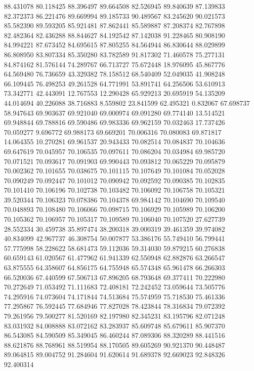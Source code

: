 88.431078
80.118425
88.396497
89.664508
82.526945
89.840639
87.139833
82.372373
86.221476
89.669994
89.185733
90.489567
83.245620
90.021573
85.582390
89.593205
85.921481
87.862441
85.589887
87.208374
82.767898
82.482364
82.436288
88.844627
84.192542
87.142038
91.228465
80.908190
84.994221
87.673452
84.695615
87.805255
84.564944
86.830644
88.029899
86.808950
83.807334
85.350280
83.782589
91.817302
71.460578
75.277131
84.874162
81.576144
74.289767
66.713727
75.672448
18.976095
45.867776
64.569480
76.736659
43.329382
78.158512
68.540409
52.049035
41.908248
66.109445
76.498253
49.261528
64.771991
53.891741
64.256506
53.610913
73.342771
42.443091
12.767553
12.290428
65.929213
20.695919
54.135209
44.014694
40.226088
38.716883
8.559802
23.841599
62.495321
0.832067
67.698737
58.947643
69.903637
69.921040
69.000974
69.091280
69.774140
13.514521
69.948844
69.788816
69.590486
69.983336
69.962159
70.032463
17.737426
70.059277
9.696772
69.988173
69.669201
70.006316
70.080083
69.871817
14.064355
10.270281
69.961537
20.943433
70.082514
70.084837
70.104636
69.647619
70.045957
70.106535
70.097611
70.086204
70.034984
69.985720
70.071521
70.093617
70.091903
69.990443
70.093812
70.065229
70.095879
70.002362
70.101655
70.038675
70.101115
70.107649
70.101084
70.052028
70.090249
70.092447
70.101012
70.090942
70.092592
70.090385
70.102835
70.101410
70.106196
70.102738
70.103482
70.106092
70.106758
70.105321
39.520344
70.106323
70.078386
70.104378
69.984142
70.104690
70.109540
70.048893
70.108480
70.106066
70.098715
70.106929
70.105989
70.106200
70.105362
70.106957
70.105317
70.109589
70.106040
70.107520
27.627739
28.552334
30.459738
35.897474
38.200318
39.000319
39.461359
39.974082
40.834099
42.967737
46.308754
50.007877
53.386176
55.749410
56.799441
57.775998
58.228622
58.681473
59.112036
59.314030
59.879215
60.276838
60.659143
61.020567
61.477962
61.941339
62.550948
62.882876
63.266547
63.875555
64.358607
64.856175
64.755948
65.574348
65.961478
66.266303
66.520036
67.440599
67.506713
67.896205
68.793648
69.377411
70.222980
70.272649
71.053492
71.111683
72.408181
72.242452
73.059644
73.505776
74.295916
74.073604
74.171844
74.513684
75.574959
75.718530
75.461336
77.295867
76.592445
77.684946
77.827028
78.423844
78.316834
79.072392
79.261956
79.500277
81.520169
82.197980
82.345231
83.195796
82.071248
83.031932
84.008888
83.072162
83.283937
85.609748
85.679611
85.907370
86.543085
84.590509
85.349045
86.460244
87.089306
88.320289
88.441516
88.621876
88.768961
88.519954
88.170505
89.605269
90.921370
90.448487
89.064815
89.004752
91.284604
91.620614
91.689378
92.669023
92.848326
92.400314
